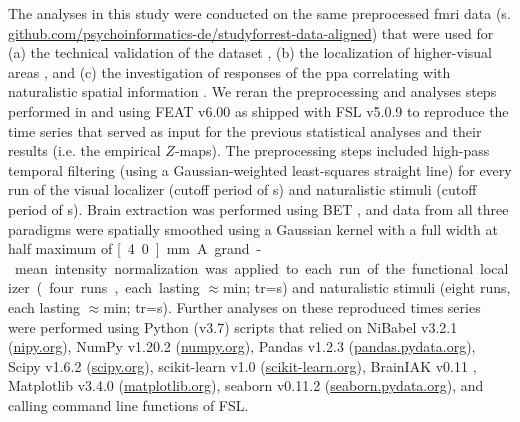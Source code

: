 The analyses in this study were conducted on the same preprocessed \ac{fmri}
data (s.
\href{https://github.com/psychoinformatics-de/studyforrest-data-aligned
}{\url{github.com/psychoinformatics-de/studyforrest-data-aligned}}) that were
used for
%
(a) the technical validation of the dataset \citep{hanke2016simultaneous},
%
(b) the localization of higher-visual areas \citep{sengupta2016extension}, and
%
(c) the investigation of responses of the \ac{ppa} correlating with naturalistic
spatial information \citep{haeusler2022processing}.
%
We reran the preprocessing and analyses steps performed in
\citet{sengupta2016extension} and \citet{haeusler2022processing} using FEAT
v6.00 \citep[FMRI Expert Analysis Tool;][]{woolrich2001autocorr} as shipped with
FSL v5.0.9 \citep[\href{https://www.fmrib.ox.ac.uk/fsl}{FMRIB's Software
Library;}][]{smith2004fsl} to reproduce the time series that served as input for
the previous statistical analyses and their results (i.e. the empirical
$Z$-maps).
The preprocessing steps included high-pass temporal filtering (using a
Gaussian-weighted least-squares straight line) for every run of the visual
localizer (cutoff period of \unit[100]{s}) and naturalistic stimuli (cutoff
period of \unit[150]{s}).
Brain extraction was performed using BET \citep{smith2002bet}, and data from all
three paradigms were spatially smoothed using a Gaussian kernel with a full
width at half maximum of \unit[4.0]{mm}.
A grand-mean intensity normalization was applied to each run of the functional
localizer (four runs, each lasting $\approx$\unit[5]{min}; \ac{tr}=\unit[2]{s})
and naturalistic stimuli (eight runs, each lasting $\approx$\unit[15]{min};
\ac{tr}=\unit[2]{s}).
%
Further analyses on these reproduced times series were performed using Python
(v3.7) scripts that relied on
%
NiBabel v3.2.1 (\href{https://nipy.org}{\url{nipy.org}}),
%
NumPy v1.20.2 (\href{https://numpy.org}{\url{numpy.org}}),
%
Pandas v1.2.3 (\href{https://pandas.pydata.org}{\url{pandas.pydata.org}}),
%
Scipy v1.6.2 (\href{https://scipy.org}{\url{scipy.org}}),
%
scikit-learn v1.0 (\href{https://scikit-learn.org}{\url{scikit-learn.org}}),
%
BrainIAK v0.11
\citep[\href{https://brainiak.org}{\url{brainiak.org}}][]{kumar2020brainiak,
kumar2020brainiaktutorial},
%
Matplotlib v3.4.0 (\href{https://matplotlib.org}{\url{matplotlib.org}}),
%
seaborn v0.11.2 (\href{https://seaborn.pydata.org}{\url{seaborn.pydata.org}}),
%
and calling command line functions of FSL.

